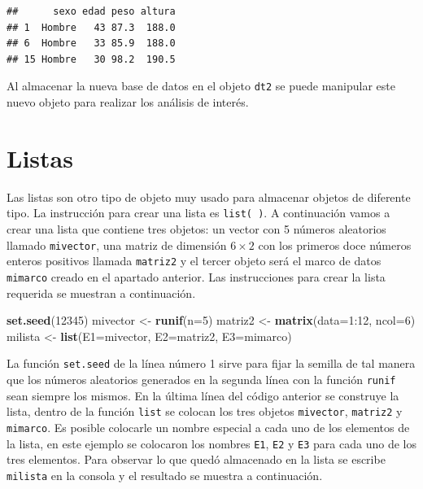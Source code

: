 \documentclass[10pt,]{krantz}
\makeatletter
\newenvironment{Shaded}{\begin{snugshade}}{\end{snugshade}}
\newcommand{\KeywordTok}[1]{\textcolor[rgb]{0.13,0.29,0.53}{\textbf{{#1}}}}
\newcommand{\DataTypeTok}[1]{\textcolor[rgb]{0.13,0.29,0.53}{{#1}}}
\newcommand{\DecValTok}[1]{\textcolor[rgb]{0.00,0.00,0.81}{{#1}}}
\newcommand{\StringTok}[1]{\textcolor[rgb]{0.31,0.60,0.02}{{#1}}}
\newcommand{\NormalTok}[1]{{#1}}
\newenvironment{kframe}{%
\medskip{}
\setlength{\fboxsep}{.8em}
 \def\at@end@of@kframe{}%
 \ifinner\ifhmode%
  \def\at@end@of@kframe{\end{minipage}}%
  \begin{minipage}{\columnwidth}%
 \fi\fi%
 \def\FrameCommand##1{\hskip\@totalleftmargin \hskip-\fboxsep
 \colorbox{shadecolor}{##1}\hskip-\fboxsep
     \hskip-\linewidth \hskip-\@totalleftmargin \hskip\columnwidth}%
 \MakeFramed {\advance\hsize-\width
   \@totalleftmargin\z@ \linewidth\hsize
   \@setminipage}}%
 {\par\unskip\endMakeFramed%
 \at@end@of@kframe}
\renewenvironment{Shaded}{\begin{kframe}}{\end{kframe}}
\makeatother
\begin{document}
\begin{verbatim}
##      sexo edad peso altura
## 1  Hombre   43 87.3  188.0
## 6  Hombre   33 85.9  188.0
## 15 Hombre   30 98.2  190.5
\end{verbatim}

Al almacenar la nueva base de datos en el objeto \texttt{dt2} se puede
manipular este nuevo objeto para realizar los análisis de interés.

\section{\texorpdfstring{Listas 
}{Listas  }}\label{listas}

Las listas son otro tipo de objeto muy usado para almacenar objetos de
diferente tipo. La instrucción para crear una lista es
\texttt{list(\ )}. A continuación vamos a crear una lista que contiene
tres objetos: un vector con 5 números aleatorios llamado
\texttt{mivector}, una matriz de dimensión \(6 \times 2\) con los
primeros doce números enteros positivos llamada \texttt{matriz2} y el
tercer objeto será el marco de datos \texttt{mimarco} creado en el
apartado anterior. Las instrucciones para crear la lista requerida se
muestran a continuación.

\begin{Shaded}
\begin{Highlighting}[]
\KeywordTok{set.seed}\NormalTok{(}\DecValTok{12345}\NormalTok{)}
\NormalTok{mivector <-}\StringTok{ }\KeywordTok{runif}\NormalTok{(}\DataTypeTok{n=}\DecValTok{5}\NormalTok{)}
\NormalTok{matriz2 <-}\StringTok{ }\KeywordTok{matrix}\NormalTok{(}\DataTypeTok{data=}\DecValTok{1}\NormalTok{:}\DecValTok{12}\NormalTok{, }\DataTypeTok{ncol=}\DecValTok{6}\NormalTok{)}
\NormalTok{milista <-}\StringTok{ }\KeywordTok{list}\NormalTok{(}\DataTypeTok{E1=}\NormalTok{mivector, }\DataTypeTok{E2=}\NormalTok{matriz2, }\DataTypeTok{E3=}\NormalTok{mimarco)}
\end{Highlighting}
\end{Shaded}

La función \texttt{set.seed} de la línea número 1 sirve para fijar la
semilla de tal manera que los números aleatorios generados en la segunda
línea con la función \texttt{runif} sean siempre los mismos. En la
última línea del código anterior se construye la lista, dentro de la
función \texttt{list} se colocan los tres objetos \texttt{mivector},
\texttt{matriz2} y \texttt{mimarco}. Es posible colocarle un nombre
especial a cada uno de los elementos de la lista, en este ejemplo se
colocaron los nombres \texttt{E1}, \texttt{E2} y \texttt{E3} para cada
uno de los tres elementos. Para observar lo que quedó almacenado en la
lista se escribe \texttt{milista} en la consola y el resultado se
muestra a continuación.
\end{document}
